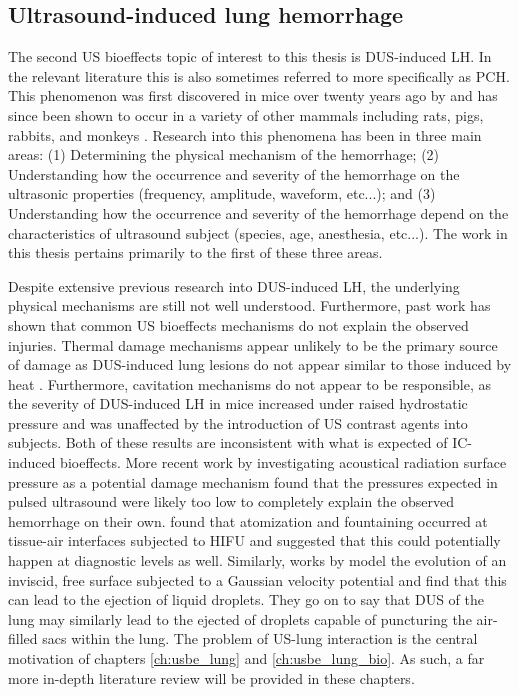 \subsection{Ultrasound-induced lung hemorrhage}
The second \ac{US} bioeffects topic of interest to this thesis is
\ac{DUS}-induced \ac{LH}. In the relevant literature this is also
sometimes referred to more specifically as \ac{PCH}. This phenomenon was first
discovered in mice over twenty years ago by \cite{Child1990} and
has since been shown to occur in a variety of other mammals including
rats, pigs, rabbits, and monkeys \cite{OBrien1997a, Miller2012,
  Tarantal1994a}. Research into this phenomena has been in three main
areas: (1) Determining the physical mechanism of the hemorrhage; (2)
Understanding how the occurrence and severity of the hemorrhage on the
ultrasonic properties (frequency, amplitude, waveform, etc...); and
(3) Understanding how the occurrence and severity of the hemorrhage depend on
the characteristics of ultrasound subject (species, age, anesthesia,
etc...). The work in this thesis pertains primarily to the first of these
three areas.

Despite extensive previous research into \ac{DUS}-induced \ac{LH}, the
underlying physical mechanisms are still not well
understood. Furthermore, past work has shown that common \ac{US}
bioeffects mechanisms do not explain the observed injuries. Thermal
damage mechanisms appear unlikely to be the primary source of damage
as \ac{DUS}-induced lung lesions do not appear similar to those
induced by heat \citep{Zachary2006}. Furthermore, cavitation
mechanisms do not appear to be responsible, as the severity of
\ac{DUS}-induced \ac{LH} in mice increased under raised hydrostatic
pressure \citep{OBrien2000} and was unaffected by the introduction of
\ac{US} contrast agents into subjects. Both of these results are
inconsistent with what is expected of \ac{IC}-induced bioeffects. More
recent work by \cite{Miller2016} investigating acoustical radiation
surface pressure as a potential damage mechanism found that the
pressures expected in pulsed ultrasound were likely too low to
completely explain the observed hemorrhage on their
own. \cite{Simon2012} found that atomization and fountaining occurred
at tissue-air interfaces subjected to \ac{HIFU} and suggested that
this could potentially happen at diagnostic levels as well. Similarly,
works by \cite{Tjan2007,Tjan2008} model the evolution of an inviscid,
free surface subjected to a Gaussian velocity potential and find that
this can lead to the ejection of liquid droplets. They go on to say
that \ac{DUS} of the lung may similarly lead to the ejected of
droplets capable of puncturing the air-filled sacs within the
lung. The problem of \ac{US}-lung interaction is the central
motivation of chapters \ref{ch:usbe_lung} and
\ref{ch:usbe_lung_bio}. As such, a far more in-depth literature review
will be provided in these chapters. 

